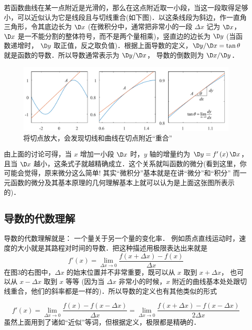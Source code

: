 若函数曲线在某一点附近是光滑的，那么在这点附近取一小段，当这一段取得足够小，可以近似认为它是线段且与切线重合(如下图)．以这条线段为斜边，作一直角三角形，令其底边长为 $\D x$ (在微积分中，通常把非常小的一段 $\Delta x$ 记为 $\D x$，  $\D x$ 是一不能分割的整体符号，而不是两个量相乘)，竖直边的边长为 $\D y$ (当函数递增时， $\D y$ 取正值，反之取负值)．根据上面导数的定义，$\D y/\D x = \tan \theta $ 就是函数的导数．所以导数通常表示为 $\D y/\D x$， 导数的倒数则为 $\D x/\D y$． 

\begin{figure}[h]
\centering
\includegraphics[width=14cm]{./figures/Der2.pdf}
\caption{将切点放大，会发现切线和曲线在切点附近“重合”}
\end{figure}




由上面的讨论可得，当 $x$ 增加一小段 $\D x$ 时，$y$ 轴的增量约为 $\D y = f'\left( x \right)\D x$，且当 $\D x$ 越小，这条式子就越精确成立．这个关系就叫函数的微分(看到这里，你可能会觉得，原来微分这么简单! 其实“微积分”基本就是在讲“微分”和“积分” 而一元函数的微分及其基本原理的几何理解基本上就可以认为是上面这张图所表示的)．


\subsection{导数的代数理解}

导数的代数理解就是： 一个量关于另一个量的变化率． 例如质点直线运动时，速度的大小就是其路程对时间的导数．把这种描述用极限表达出来就是
\begin{equation}\label{Der_eq2}
f'\left( x \right) = \mathop {\lim }\limits_{\Delta x \to 0} \frac{{f\left( {x + \Delta x} \right) - f\left( x \right)}}{{\Delta x}}
\end{equation}
在图3的右图中，$\Delta x$ 的始末位置并不非常重要，既可以从 $x$ 取到 $x + \Delta x$， 也可以从 $x - \Delta x$  取到 $x$ 等等 (因为当 $\Delta x$ 非常小的时候，$x$ 附近的曲线基本处处跟切线重合，他们的斜率都是一样的)．所以导数的定义也有其他类似的形式

\begin{equation}
f'\left( x \right) = \mathop {\lim }\limits_{\Delta x \to 0} \frac{{f\left( x \right) - f\left( {x - \Delta x} \right)}}{{\Delta x}} = \mathop {\lim }\limits_{\Delta x \to 0} \frac{{f\left( {x + \Delta x} \right) - f\left( {x - \Delta x} \right)}}{{2\Delta x}}
\end{equation}
虽然上面用到了诸如“近似”等词，但根据定义，极限都是精确的．



